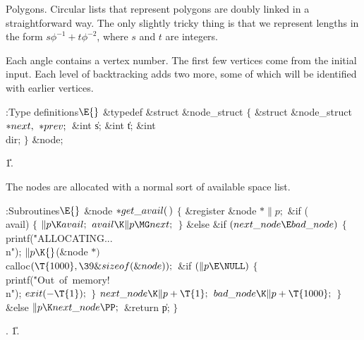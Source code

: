 Polygons. Circular lists that represent polygons
are doubly linked in a straightforward way.
The only slightly tricky thing is that we represent lengths in the
form $s\phi^{-1}+t\phi^{-2}$, where $s$ and $t$ are integers.

Each angle contains a vertex number. The first few vertices come from
the initial input. Each level of backtracking adds two more, some of
which will be identified with earlier vertices.

\Y\B\4:Type definitions\X${}\E{}$\6
\&{typedef} \&{struct} \&{node\_struct} ${}\{{}$\1\6
\&{struct} \&{node\_struct} ${}{*}\\{next},{}$ ${}{*}\\{prev};{}$\6
\&{int} \|s;\6
\&{int} \|t;\6
\&{int} \\{dir};\2\6
${}\}{}$ \&{node};\par
\U1.\fi

The nodes are allocated with a normal sort of available
space list.

\Y\B\4:Subroutines\X${}\E{}$\6
\&{node} ${}{*}\\{get\_avail}(\,){}$\1\1\2\2\6
${}\{{}$\1\6
\&{register} \&{node} ${}{*}\|p;{}$\7
\&{if} (\\{avail})\5
${}\{{}$\1\6
${}\|p\K\\{avail};{}$\6
${}\\{avail}\K\|p\MG\\{next};{}$\6
\4${}\}{}$\2\6
\&{else} \&{if} ${}(\\{next\_node}\E\\{bad\_node}){}$\5
${}\{{}$\1\6
\\{printf}(\.{"ALLOCATING...\\n"});\6
${}\|p\K{}$(\&{node} ${}{*}){}$ \\{calloc}${}(\T{1000},\39\&{sizeof}(%
\&{node}));{}$\6
\&{if} ${}(\|p\E\NULL){}$\5
${}\{{}$\1\6
\\{printf}(\.{"Out\ of\ memory!\\n"});\6
${}\\{exit}({-}\T{1});{}$\6
\4${}\}{}$\2\6
${}\\{next\_node}\K\|p+\T{1};{}$\6
${}\\{bad\_node}\K\|p+\T{1000};{}$\6
\4${}\}{}$\2\6
\&{else}\1\5
${}\|p\K\\{next\_node}\PP;{}$\2\6
\&{return} \|p;\6
\4${}\}{}$\2\par
{}.
\U1.\fi

